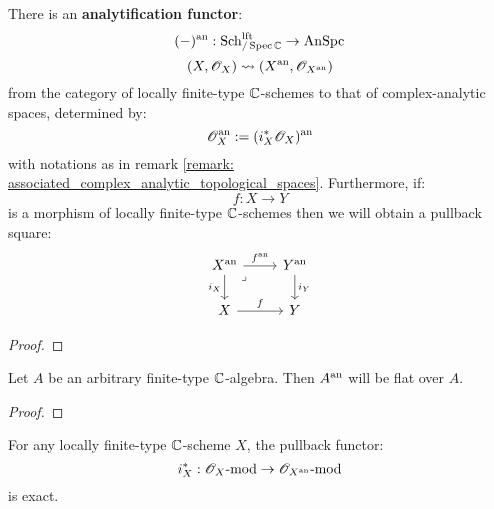             \begin{proposition} \label{prop: complex_analytic_completions_of_locally_finite_type_C_schemes}
                There is an \textbf{analytification functor}:
                    $$(-)^{\mathrm{an}}: \mathrm{Sch}_{/\operatorname{Spec} \mathbb{C}}^{\mathrm{lft}} \to \mathrm{An}\mathrm{Spc}$$
                    $$(X, \mathscr{O}_X) \leadsto (X^{\mathrm{an}}, \mathscr{O}_{X^{\mathrm{an}}})$$
                from the category of locally finite-type $\mathbb{C}$-schemes to that of complex-analytic spaces, determined by:
                    $$\mathscr{O}_X^{\mathrm{an}} := (i_X^*\mathscr{O}_X)^{\mathrm{an}}$$
                with notations as in remark \ref{remark: associated_complex_analytic_topological_spaces}. Furthermore, if:
                    $$f: X \to Y$$
                is a morphism of locally finite-type $\mathbb{C}$-schemes then we will obtain a pullback square:
                    $$
                        \begin{tikzcd}
                    	{X^{\an}} & {Y^{\an}} \\
                    	X & Y
                    	\arrow["{f^{\an}}", from=1-1, to=1-2]
                    	\arrow["f", from=2-1, to=2-2]
                    	\arrow["{i_X}"', from=1-1, to=2-1]
                    	\arrow["{i_Y}", from=1-2, to=2-2]
                    	\arrow["\lrcorner"{anchor=center, pos=0.125}, draw=none, from=1-1, to=2-2]
                        \end{tikzcd}
                    $$
            \end{proposition}
                \begin{proof}
                    
                \end{proof}
            \begin{lemma} \label{lemma: flatness_of_complex_analytifications}
                Let $A$ be an arbitrary finite-type $\mathbb{C}$-algebra. Then $A^{\mathrm{an}}$ will be flat over $A$. 
            \end{lemma}
                \begin{proof}
                    
                \end{proof}
            \begin{corollary} \label{coro: flatness_of_complex_analytifications}
                For any locally finite-type $\mathbb{C}$-scheme $X$, the pullback functor:
                    $$i_X^*: \mathscr{O}_X\text{-}\mathrm{mod} \to \mathscr{O}_{X^{\mathrm{an}}}\text{-}\mathrm{mod}$$
                is exact. 
            \end{corollary}
            
